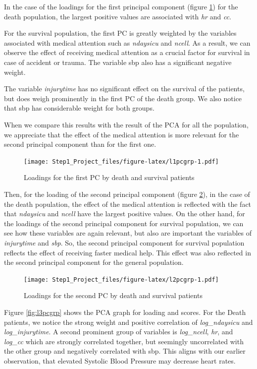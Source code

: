 \documentclass[
]{article}
\begin{document}
In the case of the loadings for the first principal component (figure
\ref{fig:l1pcgrp}) for the death population, the largest positive values
are associated with \emph{hr} and \emph{cc}.

For the survival population, the first PC is greatly weighted by the
variables associated with medical attention such as \emph{ndaysicu} and
\emph{ncell}. As a result, we can observe the effect of receiving
medical attention as a crucial factor for survival in case of accident
or trauma. The variable sbp also has a significant negative weight.

The variable \emph{injurytime} has no significant effect on the survival
of the patients, but does weigh prominently in the first PC of the death
group. We also notice that sbp has considerable weight for both groups.

When we compare this results with the result of the PCA for all the
population, we appreciate that the effect of the medical attention is
more relevant for the second principal component than for the first one.

\begin{figure}
\centering
\texttt{[image: Step1\_Project\_files/figure-latex/l1pcgrp-1.pdf]}
\caption{Loadings for the first PC by death and survival
patients\label{fig:l1pcgrp}}
\end{figure}

Then, for the loading of the second principal component (figure
\ref{fig:l2pcgrp}), in the case of the death population, the effect of
the medical attention is reflected with the fact that \emph{ndaysicu}
and \emph{ncell} have the largest positive values. On the other hand,
for the loadings of the second principal component for survival
population, we can see how these variables are again relevant, but also
are important the variables of \emph{injurytime} and \emph{sbp}. So, the
second principal component for survival population reflects the effect
of receiving faster medical help. This effect was also reflected in the
second principal component for the general population.

\begin{figure}
\centering
\texttt{[image: Step1\_Project\_files/figure-latex/l2pcgrp-1.pdf]}
\caption{Loadings for the second PC by death and survival
patients\label{fig:l2pcgrp}}
\end{figure}

\newpage

Figure \ref{fig:l3pcgrp} shows the PCA graph for loading and scores. For
the Death patients, we notice the strong weight and positive correlation
of \emph{log\_ndaysicu} and \emph{log\_injurytime}. A second prominent
group of variables is \emph{log\_ncell}, \emph{hr}, and \emph{log\_cc}
which are strongly correlated together, but seemingly uncorrelated with
the other group and negatively correlated with sbp. This aligns with our
earlier observation, that elevated Systolic Blood Pressure may decrease
heart rates.
\end{document}
